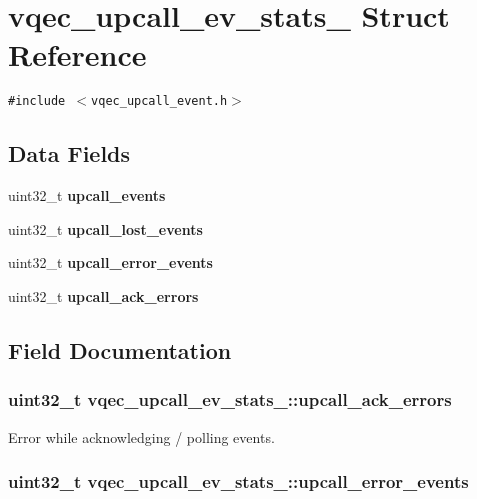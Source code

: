 \section{vqec\_\-upcall\_\-ev\_\-stats\_\- Struct Reference}
\label{structvqec__upcall__ev__stats__}
{\tt \#include $<$vqec\_\-upcall\_\-event.h$>$}

\subsection*{Data Fields}
\begin{CompactItemize}
\item 
uint32\_\-t \bf{upcall\_\-events}
\item 
uint32\_\-t \bf{upcall\_\-lost\_\-events}
\item 
uint32\_\-t \bf{upcall\_\-error\_\-events}
\item 
uint32\_\-t \bf{upcall\_\-ack\_\-errors}
\end{CompactItemize}


\subsection{Field Documentation}
\subsubsection{\setlength{\rightskip}{0pt plus 5cm}uint32\_\-t \bf{vqec\_\-upcall\_\-ev\_\-stats\_\-::upcall\_\-ack\_\-errors}}\label{structvqec__upcall__ev__stats___499a0f93a92385708ee9375cf1b3d2ff}


Error while acknowledging / polling events. 
\subsubsection{\setlength{\rightskip}{0pt plus 5cm}uint32\_\-t \bf{vqec\_\-upcall\_\-ev\_\-stats\_\-::upcall\_\-error\_\-events}}\label{structvqec__upcall__ev__stats___8707acee5e80206dd41ba34a26891ed3}


